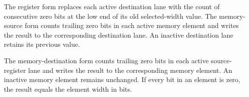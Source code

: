 The register form replaces each active destination lane with the count of
consecutive zero bits at the low end of its old selected-width value. The
memory-source form counts trailing zero bits in each active memory element and
writes the result to the corresponding destination lane. An inactive destination
lane retains its previous value.

The memory-destination form counts trailing zero bits in each active
source-register lane and writes the result to the corresponding memory element.
An inactive memory element remains unchanged. If every bit in an element is zero,
the result equals the element width in bits.
